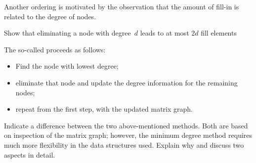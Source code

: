 Another ordering is motivated by the observation that the amount of
fill-in is related to the degree of nodes.
\begin{exercise}
  Show that eliminating a node with degree~$d$ leads to at most $2d$
  fill elements
\end{exercise}

The so-called  proceeds as follows:
\begin{itemize}
\item Find the node with lowest degree;
\item eliminate that node and update the degree information for the
  remaining nodes;
\item repeat from the first step, with the updated matrix graph.
\end{itemize}

\begin{exercise}
  Indicate a difference between the two above-mentioned methods. Both
  are based on inspection of the matrix graph; however, the minimum
  degree method requires much more flexibility in the data structures
  used. Explain why and discuss two aspects in detail.
\end{exercise}

